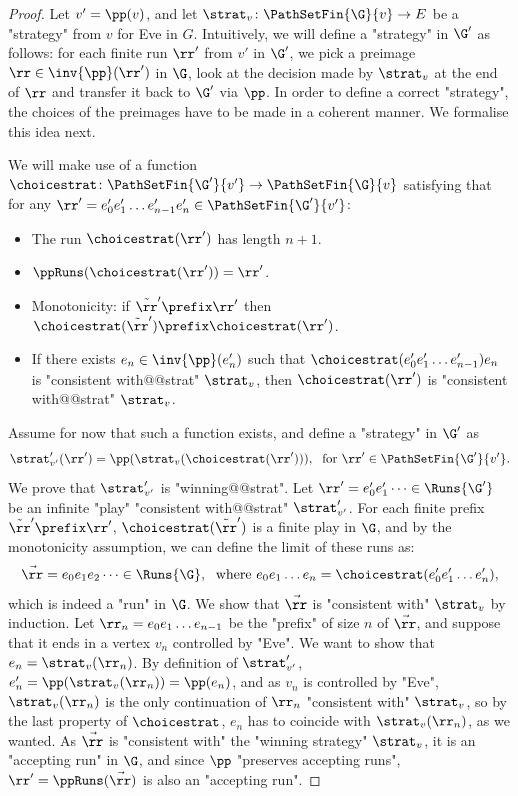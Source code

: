 \documentclass{theoretics}
\begin{document}
\begin{proof}
	Let $v' = \pp(v)$, and let $\strat_v\colon \PathSetFin{\G}{v}\to E$ be a "strategy" from $v$ for Eve in $G$. 
	Intuitively, we will define a "strategy" in $\G'$ as follows: for each finite run $\rr'$ from $v'$ in $\G'$, we pick a preimage $\rr\in \inv{\pp}(\rr')$ in $\G$, look at the decision made by $\strat_v$ at the end of $\rr$ and transfer it back to $\G'$ via $\pp$. In order to define a correct "strategy", the choices of the preimages have to be made in a coherent manner. We formalise this idea next.
	
	We will make use of a function $\choicestrat \colon \PathSetFin{\G'}{v'} \to \PathSetFin{\G}{v}$ satisfying that for any $\rr' = e_0'e_1'\dots e_{n-1}'e_n'\in \PathSetFin{\G'}{v'}$:
	\begin{itemize}
		\item The run $\choicestrat(\rr')$ has length $n+1$.
		\item  $\ppRuns(\choicestrat(\rr')) = \rr'$.
		\item Monotonicity: if $\tilde{\rr}' \prefix \rr'$ then $\choicestrat(\tilde{\rr}') \prefix \choicestrat(\rr')$.
		\item If there exists $e_n\in \inv{\pp}(e_n')$ such that $\choicestrat(e_0'e_1'\dots e_{n-1}')e_n$ is "consistent with@@strat" $\strat_v$, then $\choicestrat(\rr')$ is "consistent with@@strat" $\strat_v$.
	\end{itemize}

Assume for now that such a function exists, and define a "strategy" in $\G'$ as \[\strat'_{v'}(\rr') = \pp(\strat_v(\choicestrat(\rr'))), \;\text{ for } \rr'\in \PathSetFin{\G'}{v'}.\] %
We prove that $\strat'_{v'}$ is "winning@@strat".
 Let $\rr' =e_0'e_1'\dots\in \Runs{\G'}$ be an infinite "play" "consistent with@@strat" $\strat'_{v'}$. For each finite prefix $\tilde{\rr}'\prefix \rr'$, $\choicestrat(\tilde{\rr}')$ is a finite play in $\G$, and by the monotonicity assumption, we can define the limit of these runs as:
\[ \vec{\rr} = e_0e_1e_2\dots \in \Runs{\G}, \;\text{ where } e_0e_1\dots e_n = \choicestrat(e_0'e_1'\dots e_n'),  \]
which is indeed a "run" in $\G$. We show that $\vec{\rr}$ is "consistent with" $\strat_v$ by induction. Let $\rr_n = e_0e_1\dots e_{n-1}$ be the "prefix" of size $n$ of $\vec{\rr}$, and suppose that it ends in a vertex $v_n$ controlled by "Eve". We want to show that $e_n = \strat_v(\rr_n)$. By definition of $\strat'_{v'}$, $e_n' = \pp(\strat_v(\rr_n)) = \pp(e_n)$, and as $v_n$ is controlled by "Eve", $\strat_v(\rr_n)$ is the only continuation of $\rr_n$ "consistent with" $\strat_v$, so by the last property of $\choicestrat$, $e_n$ has to coincide with $\strat_v(\rr_n)$, as we wanted. As $\vec{\rr}$ is "consistent with" the "winning strategy" $\strat_v$, it is an "accepting run" in $\G$, and since $\pp$ "preserves accepting runs", $\rr' = \ppRuns(\vec{\rr})$ is also an "accepting run". 


\end{proof}
\end{document}
